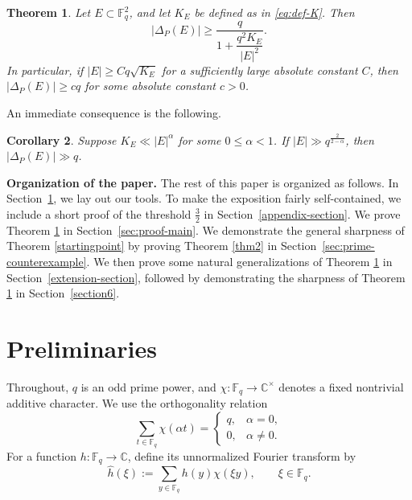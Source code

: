 \documentclass{article}
\newtheorem{theorem}{Theorem}
\newtheorem{corollary}[theorem]{Corollary}
\newcommand{\F}{\mathbb{F}}
\newcommand{\abs}[1]{\left|#1\right|}
\newcommand{\1}{\mathbf{1}}
\begin{document}
\begin{theorem}\label{thm:main}
Let $E\subset \F_q^2$, and let $K_E$ be defined as in \eqref{eq:def-K}. Then
\begin{equation}\label{eq:main-lower-bound}
\abs{\Delta_P(E)}
\ge
\frac{q}{1+\dfrac{q^2K_E}{|E|^2}}.
\end{equation}
In particular, if $|E|\ge Cq\sqrt{K_E}$ for a sufficiently large absolute constant $C$, then $\abs{\Delta_P(E)}\ge cq$ for some absolute constant $c>0$.
\end{theorem}

An immediate consequence is the following.
\begin{corollary}\label{cor:alpha}
Suppose $K_E\ll |E|^\alpha$ for some $0\le \alpha<1$. If $|E|\gg q^{\frac{2}{2-\alpha}}$, then $|\Delta_P(E)|\gg q$.
\end{corollary}




\noindent\textbf{Organization of the paper.} The rest of this paper is organized as follows. In Section~\ref{sec:preliminaries}, we lay out our tools. To make the exposition fairly self-contained, we include a short proof of the threshold $\frac{3}{2}$ in Section~\ref{appendix-section}. We prove Theorem \ref{thm:main} in Section~\ref{sec:proof-main}. We demonstrate the general sharpness of Theorem \ref{startingpoint} by proving Theorem \ref{thm2} in Section~\ref{sec:prime-counterexample}. We then prove some natural generalizations of Theorem \ref{thm:main} in Section~\ref{extension-section}, followed by demonstrating the sharpness of Theorem \ref{thm:main} in Section~\ref{section6}.


\section{Preliminaries}\label{sec:preliminaries}


Throughout, $q$ is an odd prime power, and $\chi:\F_q\to\mathbb C^\times$
denotes a fixed nontrivial additive character. We use the orthogonality relation
\begin{equation}\label{eq:orthogonality}
\sum_{t\in \F_q}\chi(\alpha t)=
\begin{cases}
q, & \alpha=0,\\
0, & \alpha\ne 0.
\end{cases}
\end{equation}
For a function $h:\F_q\to\mathbb C$, define its unnormalized Fourier transform by
\[
\widehat{h}(\xi):=\sum_{y\in \F_q}h(y)\chi(\xi y),
\qquad \xi\in \F_q.
\]
\end{document}
